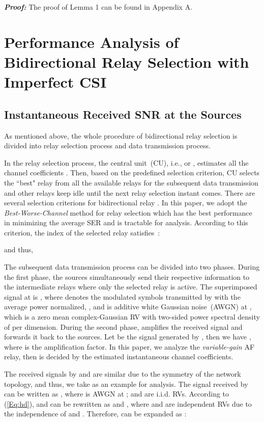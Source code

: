 \documentclass[onecolumn,letterpaper,11pt,draftclsnofoot]{IEEEtran}
\begin{document}
\textbf{\emph{Proof:}} The proof of Lemma 1 can be found in Appendix
A.

\section{Performance Analysis of Bidirectional Relay Selection with Imperfect CSI}

\subsection{Instantaneous Received SNR at the Sources}

As mentioned above, the whole procedure of bidirectional relay
selection is divided into relay selection process and data
transmission process.

In the relay selection process, the central unit~(CU), i.e., 
or , estimates all the channel coefficients .
Then, based on the predefined selection criterion, CU selects the
``best" relay from all the available relays for the subsequent data
transmission and other relays keep idle until the next relay
selection instant comes. There are several selection criterions for
bidirectional relay
\cite{Zhang2009,Kyu2009,Song2010,Song2011,Jing2009,Nguyen2010}. In
this paper, we adopt the \emph{Best-Worse-Channel} method for relay
selection which has the best performance in minimizing the average
SER and is tractable for analysis\cite{Jing2009,Nguyen2010}.
According to this criterion, the index  of the selected relay
satisfies~:

and thus,


The subsequent data transmission process can be divided into two
phases. During the first phase, the sources simultaneously send
their respective information to the intermediate relays where only
the selected relay  is active. The superimposed signal at 
is , where
 denotes the modulated symbols transmitted by  with the
average power normalized, , and  is additive white
Gaussian noise~(AWGN) at , which is a zero mean
complex-Gaussian RV with two-sided power spectral density of 
per dimension. During the second phase,  amplifies the received
signal and forwards it back to the sources. Let  be the signal
generated by , then we have ,
where  is the amplification factor. In this paper, we
analyze the \emph{variable-gain} AF relay\cite{Seung2009}, then
 is decided by the
estimated instantaneous channel coefficients.

The received signals by  and  are similar due to the
symmetry of the network topology, and thus, we take  as an
example for analysis. The signal  received by  can be
written as , where  is AWGN at
;  and  are i.i.d. RVs. According to (\ref{Eq:hd}),
 and  can be rewritten as  and , where  and  are independent RVs due to the
independence of  and . Therefore, 
can be expanded as :
\end{document}
